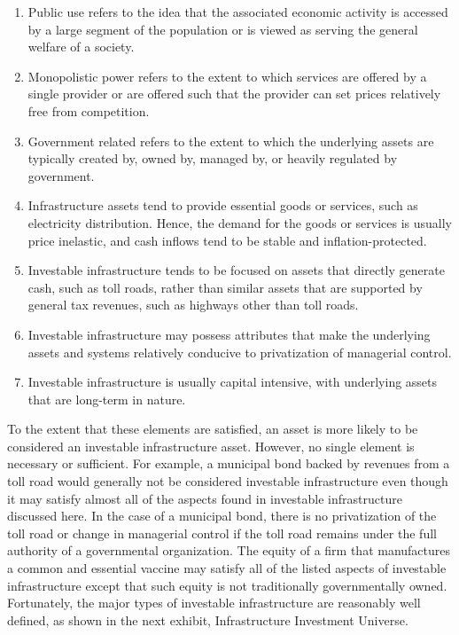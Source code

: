 \documentclass[11pt]{article}
\begin{document}
\begin{enumerate}
  \item Public use refers to the idea that the associated economic activity is accessed by a large segment of the population or is viewed as serving the general welfare of a society.

  \item Monopolistic power refers to the extent to which services are offered by a single provider or are offered such that the provider can set prices relatively free from competition.

  \item Government related refers to the extent to which the underlying assets are typically created by, owned by, managed by, or heavily regulated by government.

  \item Infrastructure assets tend to provide essential goods or services, such as electricity distribution. Hence, the demand for the goods or services is usually price inelastic, and cash inflows tend to be stable and inflation-protected.

  \item Investable infrastructure tends to be focused on assets that directly generate cash, such as toll roads, rather than similar assets that are supported by general tax revenues, such as highways other than toll roads.

  \item Investable infrastructure may possess attributes that make the underlying assets and systems relatively conducive to privatization of managerial control.

  \item Investable infrastructure is usually capital intensive, with underlying assets that are long-term in nature.

\end{enumerate}

To the extent that these elements are satisfied, an asset is more likely to be considered an investable infrastructure asset. However, no single element is necessary or sufficient. For example, a municipal bond backed by revenues from a toll road would generally not be considered investable infrastructure even though it may satisfy almost all of the aspects found in investable infrastructure discussed here. In the case of a municipal bond, there is no privatization of the toll road or change in managerial control if the toll road remains under the full authority of a governmental organization. The equity of a firm that manufactures a common and essential vaccine may satisfy all of the listed aspects of investable infrastructure except that such equity is not traditionally governmentally owned. Fortunately, the major types of investable infrastructure are reasonably well defined, as shown in the next exhibit, Infrastructure Investment Universe.
\end{document}
